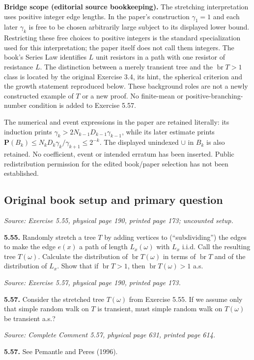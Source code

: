 \documentclass[11pt]{article}
\newcommand{\PP}{\mathbf P}
\newcommand{\br}{\operatorname{br}}
\newcommand{\src}[1]{\par\smallskip\noindent\textit{Source: #1.}\par\nopagebreak[4]\smallskip}
\begin{document}
\noindent\textbf{Bridge scope (editorial source bookkeeping).}
The stretching interpretation uses positive integer edge lengths. In the
paper's construction $\gamma_1=1$ and each later $\gamma_k$ is free to be
chosen arbitrarily large subject to its displayed lower bound. Restricting
these free choices to positive integers is the standard specialization used
for this interpretation; the paper itself does not call them integers.
The book's Series Law identifies $L$ unit resistors in a path with one
resistor of resistance $L$. The distinction between a merely transient tree
and the $\br T>1$ class is located by the original Exercise 3.4, its hint,
the spherical criterion and the growth statement reproduced below.
These background roles are not a newly constructed example of $T$ or a
new proof. No finite-mean or positive-branching-number condition is added
to Exercise 5.57.

The numerical and event expressions in the paper are retained literally:
its induction prints $\gamma_k>2N_{k-1}D_{k-1}\gamma_{k-1}$, while its later
estimate prints $\PP(B_k)\leq N_kD_k\gamma_k/\gamma_{k+1}\leq2^{-k}$.
The displayed unindexed $\cup$ in $B_k$ is also retained. No coefficient,
event or intended erratum has been inserted. Public redistribution permission
for the edited book/paper selection has not been established.
\normalsize

\subsection*{Original book setup and primary question}
\src{Exercise 5.55, physical page 190, printed page 173; uncounted setup}
\noindent\textbf{5.55.}
Randomly stretch a tree $T$ by adding vertices to (``subdividing'') the edges
to make the edge $e(x)$ a path of length $L_x(\omega)$ with $L_x$ i.i.d.
Call the resulting tree $T(\omega)$. Calculate the distribution of
$\br T(\omega)$ in terms of $\br T$ and of the distribution of $L_x$.
Show that if $\br T>1$, then $\br T(\omega)>1$ a.s.

\src{Exercise 5.57, physical page 190, printed page 173}
\noindent\textbf{5.57.}
Consider the stretched tree $T(\omega)$ from Exercise 5.55. If we assume
only that simple random walk on $T$ is transient, must simple random walk
on $T(\omega)$ be transient a.s.?

\src{Complete Comment 5.57, physical page 631, printed page 614}
\noindent\textbf{5.57.} See Pemantle and Peres (1996).
\end{document}
